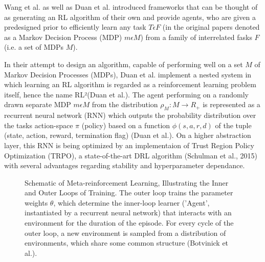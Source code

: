 \documentclass[letterpaper, 10 pt, conference]{ieeeconf}  %
\begin{document}
Wang et al. as well as Duan et al. introduced frameworks that can be thought of as generating an RL algorithm of their own and
provide agents, who are given a predesigned prior to efficiently learn any task $T \epsilon F$ (in the original papers denoted as 
a Markov Decision Process (MDP) $m \epsilon M$) from a family of interrelated fasks $F$(i.e. a set of MDPs $M$). 

In their attempt to design an algorithm, capable of performing well on a set $M$ of Markov Decision Processes (MDPs), Duan et al. implement a nested
system in which learning an RL algorithm is regarded as a reinforcement learning problem itself, hence the name RL²(Duan et al.). The agent performing 
on a randomly drawn separate MDP $m \epsilon M$ from the distribution $\rho_{M} : M \longrightarrow R_{+}$ is represented as a recurrent neural
network (RNN) which outputs the probability distribution over the tasks action-space $\pi$ (policy) based on a function $\phi (s,a,r,d)$ of 
the tuple (state, action, reward, termination flag) (Duan et al.). On a higher abstraction layer, this RNN is being 
optimized by an implementaion of Trust Region Policy Optimization (TRPO), a 
state-of-the-art DRL algorithm (Schulman et al., 2015) with several advantages regarding stability and hyperparameter dependance.\newline

\begin{figure}[thpb]
        \centering
  \caption{Schematic of Meta-reinforcement Learning, Illustrating the Inner and Outer Loops of Training. The
  outer loop trains the parameter weights $\theta$, which determine the inner-loop learner (’Agent’, instantiated by a recurrent
  neural network) that interacts with an environment for the duration of the episode. For every cycle of the outer loop, a new
  environment is sampled from a distribution of environments, which share some common structure (Botvinick et al.).}
        \label{figurelabel}
     \end{figure}
\end{document}
